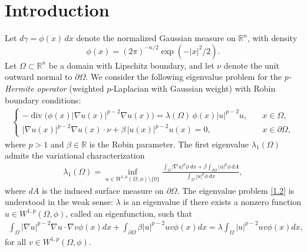 \documentclass[11pt,leqno]{amsart}
\def\p{\partial}
\def\R{\mathbb{R}}
\def\div{\operatorname{div}}
\def \p {\partial}
\numberwithin{equation}{section}
\begin{document}
\section{Introduction}
Let $d\gamma=\phi (x)\,dx$ denote the normalized Gaussian measure on $\R^n$, with density 
\begin{equation*}
\phi (x)=(2\pi)^{-n/2}\exp\left(-|x|^2/2\right).
\end{equation*}
Let $\Omega \subset \R^n$ be a domain with Lipschitz boundary, and  let $\nu$ denote the unit outward normal to $\p \Omega$. We consider the following eigenvalue problem 
 for the \emph{$p$-Hermite operator} (weighted $p$-Laplacian with Gaussian weight) with Robin boundary conditions:
\begin{align}\label{1.2}
\begin{cases}
-\div\bigl(\phi (x)|\nabla u(x)|^{p-2}\nabla u(x)\bigr)=\lambda(\Omega)\,\phi (x)|u|^{p-2}u, &\quad x\in \Omega,\\[4pt]
|\nabla u(x)|^{p-2}\nabla u(x)\cdot\nu+\beta\,|u(x)|^{p-2}u(x)=0, & \quad x\in \partial\Omega,
\end{cases}
\end{align}
where $p>1$ and $\beta\in \R$ is the Robin parameter. The first eigenvalue $\lambda_1(\Omega)$ admits the variational characterization
\begin{align}\label{variational formula}
\lambda_1(\Omega)=\inf_{u\in W^{1,p}(\Omega,\phi )\setminus\{0\}}
\frac{\int_{\Omega}|\nabla u|^p\phi \,dx
+\beta\int_{\partial\Omega}|u|^p\phi \,dA}
{\int_{\Omega}|u|^p\phi \,dx},
\end{align}
where $dA$ is the induced  surface measure on $\p \Omega$.
The eigenvalue problem \eqref{1.2} is understood in the weak sense: $\lambda$ is an eigenvalue if there exists a nonzero function $u\in W^{1,p}(\Omega,\phi )$, called an eigenfunction, such that 
\begin{align}\label{weak form}
    \int_{\Omega}|\nabla u|^{p-2}\nabla u\cdot \nabla v \phi (x)dx+\int_{\partial \Omega}\beta |u|^{p-2}uv\phi (x)dx=\lambda\int_{\Omega}|u|^{p-2}uv\phi (x)dx,
\end{align}
for all $v\in W^{1,p}(\Omega,\phi )$.
\end{document}
